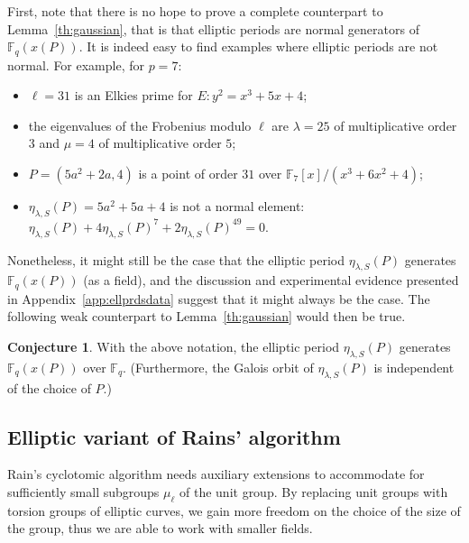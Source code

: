 \documentclass[12pt]{article}
\theoremstyle{plain}
\theoremstyle{definition}
\newtheorem{conjecture}[theorem]{Conjecture}
\def\F{\ensuremath{\mathbb{F}}}
\newcounter{algorithm}
\begin{document}
First, note that there is no hope to prove a complete counterpart to
Lemma~\ref{th:gaussian}, that is that elliptic periods are normal generators
of $\F_q(x(P))$.
It is indeed easy to find examples where elliptic periods are not normal.
For example, for $p = 7$:
\begin{itemize}
\item $\ell = 31$ is an Elkies prime for $E: y^2 = x^3 + 5 x + 4$;
\item the eigenvalues of the Frobenius modulo $\ell$ are $\lambda = 25$ of
multiplicative order $3$ and $\mu = 4$ of multiplicative order $5$;
\item $P = (5 a^2+2 a, 4)$ is a point of order $31$ over $\F_7[x]/(x^3 + 6 x^2 + 4)$;
\item $\eta_{\lambda,S}(P) = 5 a^2 + 5 a + 4$ is not a normal element:
$\eta_{\lambda,S}(P) + 4 \eta_{\lambda,S}(P)^7 + 2 \eta_{\lambda,S}(P)^{49} = 0$.
\end{itemize}
Nonetheless, it might still be the case that the elliptic period
$\eta_{\lambda,S}(P)$ generates $\F_q(x(P))$ (as a field),
and the discussion and experimental evidence
presented in Appendix~\ref{app:ellprdsdata}
suggest that it might always be the case.
The following weak counterpart to Lemma~\ref{th:gaussian} would then
be true.
\begin{conjecture}
\label{conj:ellperiods}
With the above notation, the elliptic period $\eta_{\lambda,S}(P)$
generates $\F_q(x(P))$ over $\F_q$.
(Furthermore, the Galois orbit of $\eta_{\lambda,S}(P)$ is
independent of the choice of $P$.)
\end{conjecture}

\subsection{Elliptic variant of Rains' algorithm}

Rain's cyclotomic algorithm needs auxiliary extensions to accommodate
for sufficiently small subgroups $\mu_\ell$ of the unit group. By
replacing unit groups with torsion groups of elliptic curves, we gain
more freedom on the choice of the size of the group, thus we are able
to work with smaller fields.  
\end{document}
